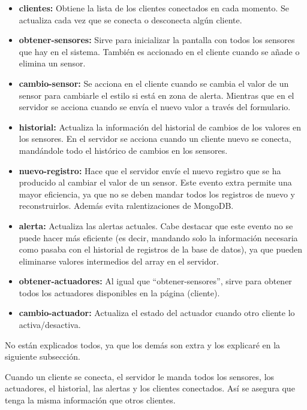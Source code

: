 \documentclass{article}
\begin{document}
\begin{itemize}
    \item \textbf{clientes: }Obtiene la lista de los clientes conectados en cada momento. Se actualiza cada vez que se conecta o desconecta algún cliente.
    \item \textbf{obtener-sensores: }Sirve para inicializar la pantalla con todos los sensores que hay en el sistema. También es accionado en el cliente cuando se añade o elimina un sensor.
    \item \textbf{cambio-sensor: }Se acciona en el cliente cuando se cambia el valor de un sensor para cambiarle el estilo si está en zona de alerta. Mientras que en el servidor se acciona cuando se envía el nuevo valor a través del formulario.
    \item \textbf{historial: }Actualiza la información del historial de cambios de los valores en los sensores. En el servidor se acciona cuando un cliente nuevo se conecta, mandándole todo el histórico de cambios en los sensores.
    \item \textbf{nuevo-registro: }Hace que el servidor envíe el nuevo registro que se ha producido al cambiar el valor de un sensor. Este evento extra permite una mayor eficiencia, ya que no se deben mandar todos los registros de nuevo y reconstruirlos. Además evita ralentizaciones de MongoDB.
    \item \textbf{alerta: }Actualiza las alertas actuales. Cabe destacar que este evento no se puede hacer más eficiente (es decir, mandando solo la información necesaria como pasaba con el historial de registros de la base de datos), ya que pueden eliminarse valores intermedios del array en el servidor.
    \item \textbf{obtener-actuadores: }Al igual que ``obtener-sensores'', sirve para obtener todos los actuadores disponibles en la página (cliente).
    \item \textbf{cambio-actuador: }Actualiza el estado del actuador cuando otro cliente lo activa/desactiva.
\end{itemize}

No están explicados todos, ya que los demás son extra y los explicaré en la siguiente subsección.

\bigskip

Cuando un cliente se conecta, el servidor le manda todos los sensores, los actuadores, el historial, las alertas y los clientes conectados. Así se asegura que tenga la misma información que otros clientes.

\bigskip
\end{document}
